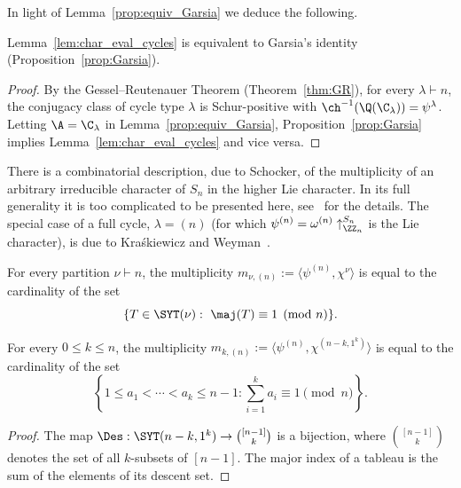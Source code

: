 In light of Lemma~\ref{prop:equiv_Garsia} we deduce the following. 

\begin{corollary}
    Lemma~\ref{lem:char_eval_cycles} is equivalent to Garsia's identity (Proposition~\ref{prop:Garsia}).
\end{corollary}

\begin{proof}
    By the Gessel--Reutenauer Theorem (Theorem~\ref{thm:GR}), for every $\lambda \vdash n$, 
    the conjugacy class of cycle type $\lambda$ is Schur-positive with $\ch^{-1}(\Q(\C_\lambda))=\psi^\lambda$. 
    Letting $\A = \C_\lambda$ in Lemma~\ref{prop:equiv_Garsia}, 
    Proposition~\ref{prop:Garsia} implies Lemma~\ref{lem:char_eval_cycles} and vice versa.
\end{proof}

There is a combinatorial description, due to Schocker,
of the multiplicity of an arbitrary irreducible character of $S_n$ in the higher Lie character. 
In its full generality it is too complicated to be presented here, see~\cite{schocker} for the details. 
The special case of a full cycle, $\lambda=(n)$ (for which
$\psi^{(n)} = \omega^{(n)}\uparrow_{\ZZ_n}^{S_n}$ is the Lie character), is due 
to Kra\'skiewicz and Weyman~\cite{KraskiewiczWeyman}. 
	
\begin{theorem}\label{thm:KW}
    For every partition \mbox{$\nu\vdash n$}, the multiplicity $m_{\nu,(n)} := \langle \psi^{(n)},\chi^{\nu} \rangle$ is equal to the cardinality of the set
    \[
        \{T \in \SYT(\nu):\ \maj(T) \equiv 1 \pmod n\}.
    \]	
\end{theorem}
	
\begin{corollary}\label{lem:Kra-Wey}
    For every $0\leq k\leq n$, the multiplicity 
    $m_{k,(n)} := \langle \psi^{(n)},\chi^{(n-k,1^k)} \rangle$ 
    is equal to the cardinality of the set
    \[
        \left\{ 1 \le a_1 < \cdots < a_k \le n-1 : \sum_{i=1}^k a_i \equiv 1 \!\!\!\!\pmod{n} \right\}.
    \]
\end{corollary}
	
\begin{proof}
    The map $\Des: \SYT(n-k,1^k) \rightarrow \binom{[n-1]}{k}$ is a bijection, where $\binom{[n-1]}{k}$ denotes the set of all $k$-subsets of $[n-1]$.
    The major index of a tableau is the sum of the elements of its descent set.
\end{proof}
	
